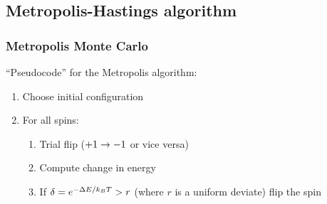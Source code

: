 \documentclass[hyperref={colorlinks=true}]{beamer}
\begin{document}
\subsection[Metropolis-Hastings algorithm]{Metropolis-Hastings algorithm}


\begin{frame}%
  \frametitle{Metropolis Monte Carlo}
  
  ``Pseudocode'' for the Metropolis algorithm:
  
  \begin{enumerate}
    \item Choose initial configuration
    \item For all spins:
    \begin{enumerate}
      \item Trial flip ($+1 \rightarrow -1$ or vice versa)
      \item Compute change in energy
      \item If $\delta = e^{- \Delta E/k_B T} > r$ (where $r$ is a uniform deviate) flip the spin 
    \end{enumerate}
  \end{enumerate}
  
    
\end{frame}






%
%
%  

\end{document}
